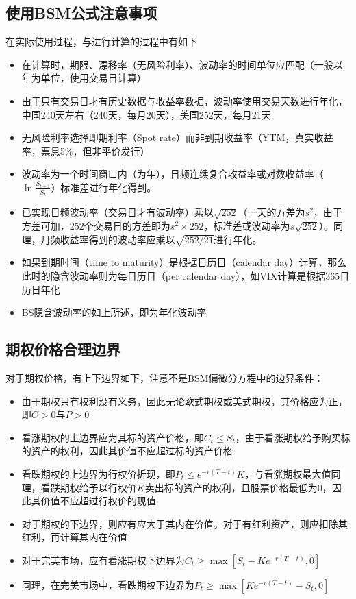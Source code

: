 \documentclass[11pt]{article}
\begin{document}
\subsection{使用BSM公式注意事项}

在实际使用过程，与进行计算的过程中有如下
\begin{itemize}[leftmargin=4em]
    \item 在计算时，期限、漂移率（无风险利率）、波动率的时间单位应匹配（一般以年为单位，使用交易日计算）
    \item 由于只有交易日才有历史数据与收益率数据，波动率使用交易天数进行年化，中国240天左右（240天，每月20天），美国252天，每月21天
    \item 无风险利率选择即期利率（Spot rate）而非到期收益率（YTM，真实收益率，票息5\%，但非平价发行）
    \item 波动率为一个时间窗口内（为年），日频连续复合收益率或对数收益率（$\ln\frac{S_{t+1}}{S_{t}}$）标准差进行年化得到。
    \item 已实现日频波动率（交易日才有波动率）乘以$\sqrt{252}$（一天的方差为$s^2$，由于方差可加，252个交易日的方差即为$s^2 \times 252$，标准差或波动率为$s\sqrt{252}$）。同理，月频收益率得到的波动率应乘以$\sqrt{252/21}$进行年化。
    \item 如果到期时间（time to maturity）是根据日历日（calendar day）计算，那么此时的隐含波动率则为每日历日（per calendar day），如VIX计算是根据365日历日年化
    \item BS隐含波动率的如上所述，即为年化波动率
\end{itemize}

\subsection{期权价格合理边界}

对于期权价格，有上下边界如下，注意不是BSM偏微分方程中的边界条件：
\begin{itemize}
    \item 由于期权只有权利没有义务，因此无论欧式期权或美式期权，其价格应为正，即$C>0$与$P>0$
    \item 看涨期权的上边界应为其标的资产价格，即$C_t \leq S_t$，由于看涨期权给予购买标的资产的权利，因此其价值不应超过标的资产价格
    \item 看跌期权的上边界为行权价折现，即$P_t \leq e^{-r(T-t)}K$，与看涨期权最大值同理，看跌期权给予以行权价$K$卖出标的资产的权利，且股票价格最低为0，因此其价值不应超过行权价的现值
    \item 对于期权的下边界，则应有应大于其内在价值。对于有红利资产，则应扣除其红利，再计算其内在价值
    \item 对于完美市场，应有看涨期权下边界为$C_t \geq \max \left[ S_t-Ke^{-r(T-t)} , 0 \right]$
    \item 同理，在完美市场中，看跌期权下边界为$P_t \geq \max \left[ Ke^{-r(T-t)} - S_t,0 \right]$
\end{itemize}
\end{document}
